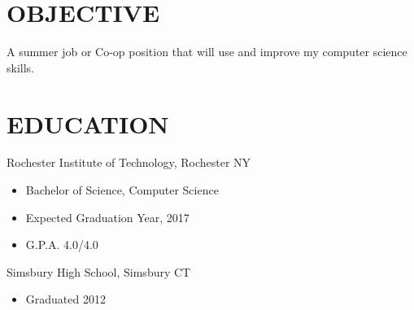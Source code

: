 \documentclass{res}
\begin{document}
                                 
\begin{resume}

\section{OBJECTIVE}          
    A summer job or Co-op position that will use and improve my computer science skills.
 
\section{EDUCATION}          
	
	    Rochester Institute of Technology, Rochester NY
      \begin{itemize}
          \item Bachelor of Science, Computer Science
	        \item Expected Graduation Year, 2017
	        \item G.P.A. 4.0/4.0
      \end{itemize}
	    Simsbury High School, Simsbury CT
      \begin{itemize}
          \item Graduated 2012
		  \end{itemize}

 

\end{resume}
\end{document}
